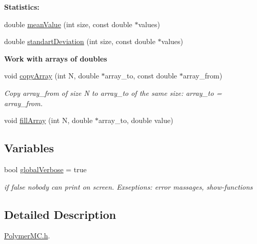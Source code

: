 \begin{Indent}{\bf Statistics\+:}\par
\begin{DoxyCompactItemize}
\item 
double \hyperlink{namespace_p_c_a_a330e0aee67470237e1e755eb5b151d6c}{mean\+Value} (int size, const double $\ast$values)
\item 
double \hyperlink{namespace_p_c_a_ae9120f4f9875a87768cc3090196892a8}{standart\+Deviation} (int size, const double $\ast$values)
\end{DoxyCompactItemize}
\end{Indent}
\begin{Indent}{\bf Work with arrays of doubles}\par
\begin{DoxyCompactItemize}
\item 
void \hyperlink{namespace_p_c_a_ac0ca09771710ce44c06d3f5f4402fd80}{copy\+Array} (int N, double $\ast$array\+\_\+to, const double $\ast$array\+\_\+from)
\begin{DoxyCompactList}\small\item\em Copy array\+\_\+from of size N to array\+\_\+to of the same size\+: array\+\_\+to = array\+\_\+from. \end{DoxyCompactList}\item 
void \hyperlink{namespace_p_c_a_af4a7844595578d2c8e09635fba6db3b2}{fill\+Array} (int N, double $\ast$array\+\_\+to, double value)
\end{DoxyCompactItemize}
\end{Indent}
\subsection*{Variables}
\begin{DoxyCompactItemize}
\item 
bool \hyperlink{namespace_p_c_a_a01cf2b18a2d7669f5be721c2142bf67d}{global\+Verbose} = true
\begin{DoxyCompactList}\small\item\em if false nobody can print on screen. Exseptions\+: error massages, show-\/functions \end{DoxyCompactList}\end{DoxyCompactItemize}


\subsection{Detailed Description}
\hyperlink{_polymer_m_c_8h}{Polymer\+M\+C.\+h}. 

